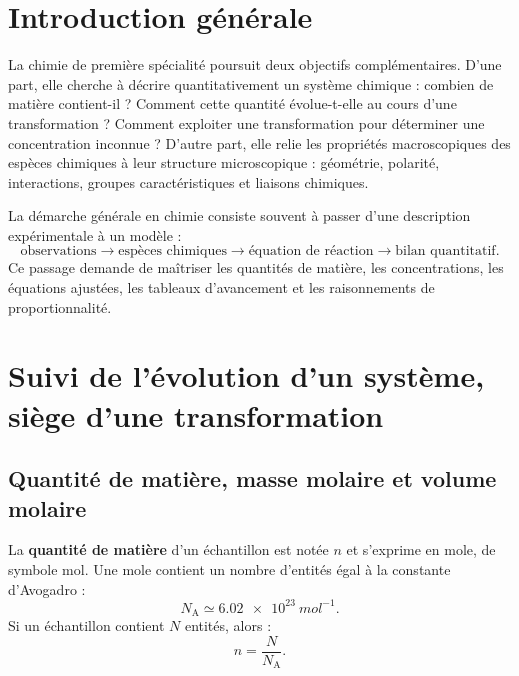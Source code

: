 \documentclass[11pt,a4paper]{article}
\newcommand{\Na}{N_{\mathrm A}}
\begin{document}
\tableofcontents
\newpage

\section*{Introduction générale}

La chimie de première spécialité poursuit deux objectifs complémentaires. D'une part, elle cherche à décrire quantitativement un système chimique : combien de matière contient-il ? Comment cette quantité évolue-t-elle au cours d'une transformation ? Comment exploiter une transformation pour déterminer une concentration inconnue ? D'autre part, elle relie les propriétés macroscopiques des espèces chimiques à leur structure microscopique : géométrie, polarité, interactions, groupes caractéristiques et liaisons chimiques.

\begin{retenirbox}
La démarche générale en chimie consiste souvent à passer d'une description expérimentale à un modèle :
\[
\text{observations} \longrightarrow \text{espèces chimiques} \longrightarrow \text{équation de réaction} \longrightarrow \text{bilan quantitatif}.
\]
Ce passage demande de maîtriser les quantités de matière, les concentrations, les équations ajustées, les tableaux d'avancement et les raisonnements de proportionnalité.
\end{retenirbox}

\section{Suivi de l'évolution d'un système, siège d'une transformation}

\subsection{Quantité de matière, masse molaire et volume molaire}

\begin{definitionbox}
La \textbf{quantité de matière} d'un échantillon est notée $n$ et s'exprime en mole, de symbole \si{mol}. Une mole contient un nombre d'entités égal à la constante d'Avogadro :
\[
\Na \simeq \SI{6.02e23}{mol^{-1}}.
\]
Si un échantillon contient $N$ entités, alors :
\[
n=\frac{N}{\Na}.
\]
\end{definitionbox}
\end{document}
